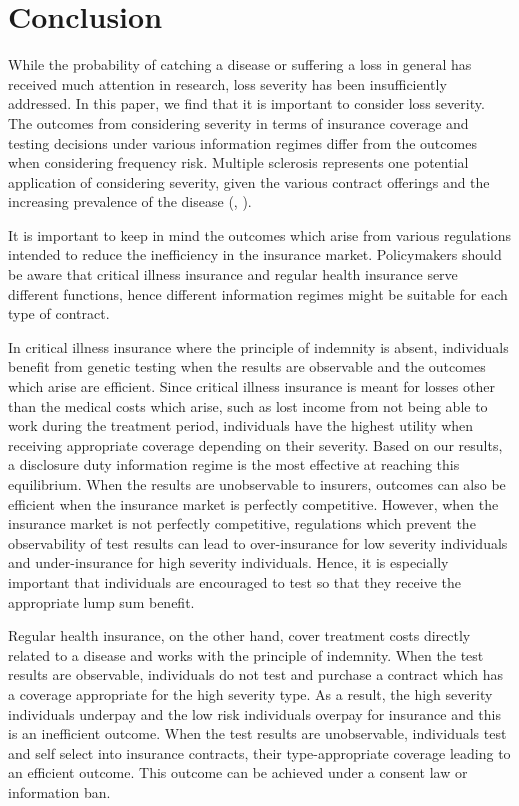 \documentclass[nonatbib,preprint,12pt]{elsarticle}
\theoremstyle{plain}
\theoremstyle{definition}
\theoremstyle{plain}
\theoremstyle{TheoremNum}
\theoremstyle{CorollaryNum}
\theoremstyle{PropositionNum}
\theoremstyle{TheoremNum}
\begin{document}
\section{Conclusion}

While the probability of catching a disease or suffering a loss in general has received much attention in research, loss severity has been insufficiently addressed. In this paper, we find that it is important to consider loss severity. The outcomes from considering severity in terms of insurance coverage and testing decisions under various information regimes differ from the outcomes when considering frequency risk. Multiple sclerosis represents one potential application of considering severity, given the various contract offerings and the increasing prevalence of the disease (\citeauthor{flachenecker2017new}, \citeyear{flachenecker2017new}). 

It is important to keep in mind the outcomes which arise from various regulations intended to reduce the inefficiency in the insurance market. Policymakers should be aware that critical illness insurance and regular health insurance serve different functions, hence different information regimes might be suitable for each type of contract. 

In critical illness insurance where the principle of indemnity is absent, individuals benefit from genetic testing when the results are observable and the outcomes which arise are efficient. Since critical illness insurance is meant for losses other than the medical costs which arise, such as lost income from not being able to work during the treatment period, individuals have the highest utility when receiving appropriate coverage depending on their severity. Based on our results, a disclosure duty information regime is the most effective at reaching this equilibrium. When the results are unobservable to insurers, outcomes can also be efficient when the insurance market is perfectly competitive. However, when the insurance market is not perfectly competitive, regulations which prevent the observability of test results can lead to over-insurance for low severity individuals and under-insurance for high severity individuals. Hence, it is especially important that individuals are encouraged to test so that they receive the appropriate lump sum benefit. 

Regular health insurance, on the other hand, cover treatment costs directly related to a disease and works with the principle of indemnity. When the test results are observable, individuals do not test and purchase a contract which has a coverage appropriate for the high severity type. As a result, the high severity individuals underpay and the low risk individuals overpay for insurance and this is an inefficient outcome. When the test results are unobservable, individuals test and self select into insurance contracts, their type-appropriate coverage leading to an efficient outcome. This outcome can be achieved under a consent law or information ban. 
\end{document}
